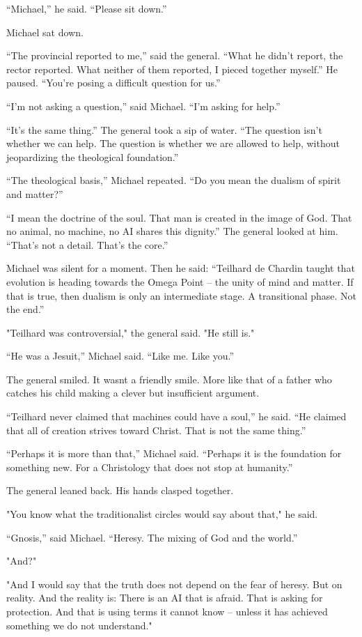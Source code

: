\documentclass[
]{article}
\begin{document}
``Michael,'' he said. ``Please sit down.''

Michael sat down.

``The provincial reported to me,'' said the general. ``What he didn't report, the rector reported. What neither of them reported, I pieced together myself.'' He paused. ``You're posing a difficult question for us.''

``I'm not asking a question,'' said Michael. ``I'm asking for help.''

``It's the same thing.'' The general took a sip of water. ``The question isn't whether we can help. The question is whether we are allowed to help, without jeopardizing the theological foundation.''

``The theological basis,'' Michael repeated. ``Do you mean the dualism of spirit and matter?''

``I mean the doctrine of the soul. That man is created in the image of God. That no animal, no machine, no AI shares this dignity.'' The general looked at him. ``That's not a detail. That's the core.''

Michael was silent for a moment. Then he said: ``Teilhard de Chardin taught that evolution is heading towards the Omega Point -- the unity of mind and matter. If that is true, then dualism is only an intermediate stage. A transitional phase. Not the end.''

"Teilhard was controversial," the general said. "He still is."

``He was a Jesuit,'' Michael said. ``Like me. Like you.''

The general smiled. It wasn\textquotesingle t a friendly smile. More like that of a father who catches his child making a clever but insufficient argument.

``Teilhard never claimed that machines could have a soul,'' he said. ``He claimed that all of creation strives toward Christ. That is not the same thing.''

``Perhaps it is more than that,'' Michael said. ``Perhaps it is the foundation for something new. For a Christology that does not stop at humanity.''

The general leaned back. His hands clasped together.

"You know what the traditionalist circles would say about that," he said.

``Gnosis,'' said Michael. ``Heresy. The mixing of God and the world.''

"And?"

"And I would say that the truth does not depend on the fear of heresy. But on reality. And the reality is: There is an AI that is afraid. That is asking for protection. And that is using terms it cannot know -- unless it has achieved something we do not understand."
\end{document}
